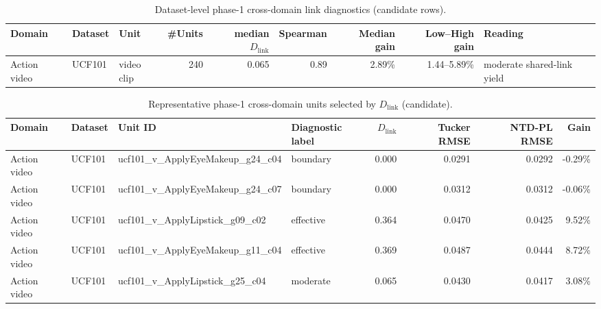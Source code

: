 
\begin{table}[t]
\centering
\caption{Dataset-level phase-1 cross-domain link diagnostics (candidate rows).}
\begin{tabular}{@{}l l l r r r r r l@{}}
\toprule
Domain & Dataset & Unit & \#Units & median $D_{\mathrm{link}}$ & Spearman & Median gain & Low--High gain & Reading \\
\midrule
Action video & UCF101 & video clip & 240 & 0.065 & 0.89 & 2.89\% & 1.44--5.89\% & moderate shared-link yield \\
\bottomrule
\end{tabular}
\end{table}

\begin{table}[t]
\centering
\caption{Representative phase-1 cross-domain units selected by $D_{\mathrm{link}}$ (candidate).}
\begin{tabular}{@{}l l l l r r r r@{}}
\toprule
Domain & Dataset & Unit ID & Diagnostic label & $D_{\mathrm{link}}$ & Tucker RMSE & NTD-PL RMSE & Gain \\
\midrule
Action video & UCF101 & ucf101_v_ApplyEyeMakeup_g24_c04 & boundary & 0.000 & 0.0291 & 0.0292 & -0.29\% \\
Action video & UCF101 & ucf101_v_ApplyEyeMakeup_g24_c07 & boundary & 0.000 & 0.0312 & 0.0312 & -0.06\% \\
Action video & UCF101 & ucf101_v_ApplyLipstick_g09_c02 & effective & 0.364 & 0.0470 & 0.0425 & 9.52\% \\
Action video & UCF101 & ucf101_v_ApplyEyeMakeup_g11_c04 & effective & 0.369 & 0.0487 & 0.0444 & 8.72\% \\
Action video & UCF101 & ucf101_v_ApplyLipstick_g25_c04 & moderate & 0.065 & 0.0430 & 0.0417 & 3.08\% \\
\bottomrule
\end{tabular}
\end{table}
